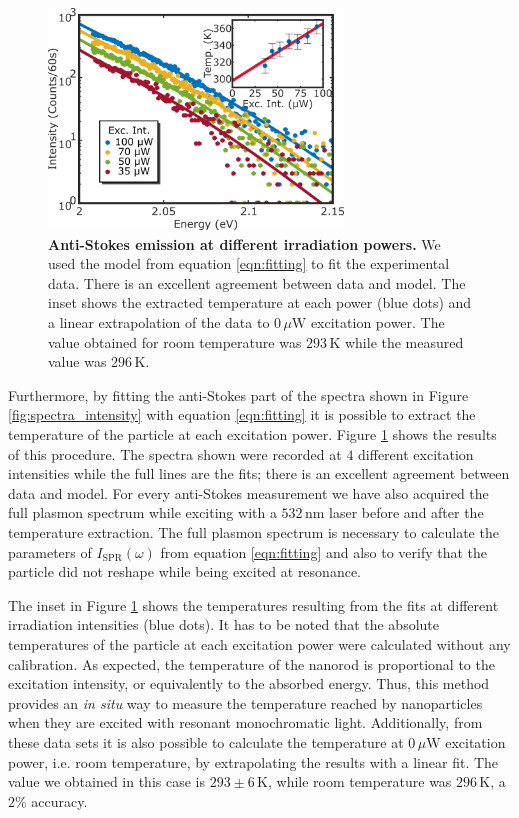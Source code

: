 \documentclass[journal=nalefd,manuscript=letter]{achemso}
\newcommand{\K}{\ensuremath{\,\textrm{K}}}
\newcommand{\nm}{\ensuremath{\,\textrm{nm}}}
\newcommand{\uW}{\ensuremath{\,\mu\textrm{W}}}
\begin{document}
\begin{figure}[tp] \centering
\includegraphics[width=78.4mm]{Figures/03_Fit_Of_AS/03_Log_Fit_AS.png}
\caption{\textbf{Anti-Stokes emission at different irradiation powers.} We used 
the model from equation \ref{eqn:fitting} to fit the experimental data. 
There is an excellent agreement between data and model. The inset shows the extracted
temperature at each power (blue dots) and a linear 
extrapolation of the data to $0\uW$ excitation power.
The value obtained for room temperature was $293\K$ while the measured value was
$296\K$.}
	\label{fig:AS_in_Log}
\end{figure}

Furthermore, by fitting the anti-Stokes part of the spectra shown in Figure
\ref{fig:spectra_intensity} with equation \ref{eqn:fitting} it is possible to extract
the temperature of the particle at each excitation power. Figure
\ref{fig:AS_in_Log} shows the results of this procedure. The spectra shown were
recorded at $4$ different excitation intensities while the full lines are the
fits; there is an excellent agreement between data and model. For every
anti-Stokes measurement we have also acquired the full plasmon spectrum while
exciting with a $532\nm$ laser before and after the temperature extraction.
The full plasmon spectrum is necessary to calculate the parameters of
$I_\textrm{SPR}(\omega)$ from equation \ref{eqn:fitting} and also to verify that the
particle did not reshape while being excited at resonance. 

The inset in Figure \ref{fig:AS_in_Log} shows the temperatures resulting from
the fits at different irradiation intensities (blue dots). It has to be noted
that the absolute temperatures of the particle at each excitation power were
calculated without any calibration. As expected, the temperature of the nanorod
is proportional to the excitation intensity, or equivalently to the absorbed
energy. Thus, this method provides an \textit{in situ} way to measure the
temperature reached by nanoparticles when they are excited with resonant
monochromatic light. Additionally, from these data sets it  is also possible to
calculate the temperature at $0\uW$ excitation power, i.e. room temperature, by
extrapolating the results with a linear fit. The value we obtained in this case
is $293\pm 6 \K$, while room temperature was $296\K$, a $2\%$ accuracy.
\end{document}
